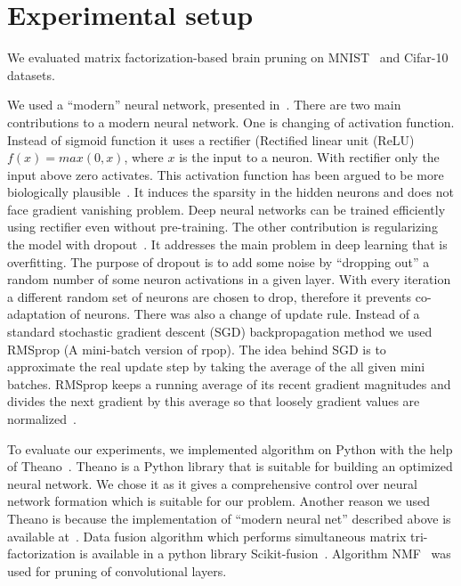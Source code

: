\documentclass{article} %
\begin{document}
\section{Experimental setup}

We evaluated matrix factorization-based brain pruning on 
MNIST~\cite{lecun-mnisthandwrittendigit-2010} and 
Cifar-10~\cite{krizhevsky2009learning} datasets. 

We used a “modern” neural network, presented in~\cite{github}. There are two
main contributions to a modern neural network. One is changing of activation
function. Instead of sigmoid function it uses a rectifier (Rectified linear 
unit (ReLU) $f(x) = max(0, x)$, where $x$ is the input to a neuron. With
rectifier only the input above zero activates. This
activation function has been argued to be more biologically
plausible~\cite{AISTATS2011_GlorotBB11}. It induces the sparsity in the hidden
neurons and does not face gradient vanishing problem. Deep neural networks
can be trained efficiently using rectifier even without pre-training. 
The other contribution is regularizing the model with
dropout~\cite{srivastava2014dropout}. It addresses
the main problem in deep learning that is overfitting. The purpose of dropout
is to add some noise by “dropping out” a random number of some neuron
activations in a given layer. With every iteration a different random set of
neurons are chosen to drop, therefore it prevents co-adaptation of neurons.
There was also a change of update rule. Instead of a standard stochastic
gradient descent (SGD) backpropagation method we used RMSprop (A mini-batch
version of rpop). The idea behind SGD is to approximate the real update step by
taking the average of the all given mini batches.
RMSprop keeps a running average of its recent gradient magnitudes and divides
the next gradient by this average so that loosely gradient values are
normalized~\cite{lecture}. 

To evaluate our experiments, we implemented algorithm on Python with the help
of Theano~\cite{Bastien-Theano-2012, bergstra+al:2010-scipy}. Theano is a
Python library that is suitable for building an optimized neural network. We
chose it as it gives a comprehensive control over neural network formation
which is suitable for our problem. Another reason we used Theano is because the
implementation of “modern neural net” described above is available 
at~\cite{github}.
Data fusion algorithm which performs simultaneous matrix
tri-factorization is available in a python library
Scikit-fusion~\cite{zitnik2015data}. Algorithm NMF~\cite{Zitnik2012} was used 
for pruning of convolutional layers.
\end{document}
